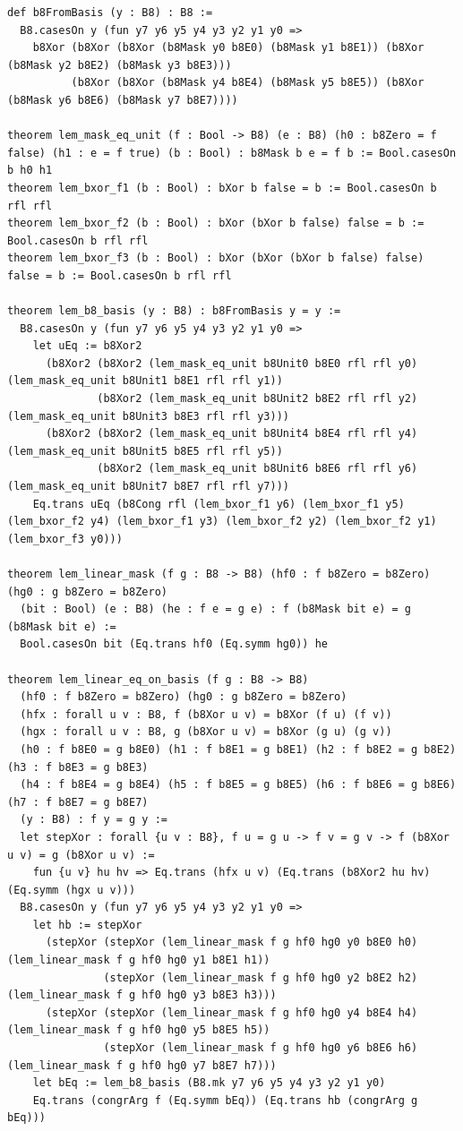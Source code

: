 \documentclass[11pt,letterpaper]{article}
\theoremstyle{spectralthm}
\begin{document}
\begin{lstlisting}[language=Lean4,caption={Standalone Pure Init.Prelude Term-Mode Lean 4 Kernel Suite (thm30--thm61, v0.0.0, 0 sorry, 0 axioms).},label={lst:lean_unified}]
def b8FromBasis (y : B8) : B8 :=
  B8.casesOn y (fun y7 y6 y5 y4 y3 y2 y1 y0 =>
    b8Xor (b8Xor (b8Xor (b8Mask y0 b8E0) (b8Mask y1 b8E1)) (b8Xor (b8Mask y2 b8E2) (b8Mask y3 b8E3)))
          (b8Xor (b8Xor (b8Mask y4 b8E4) (b8Mask y5 b8E5)) (b8Xor (b8Mask y6 b8E6) (b8Mask y7 b8E7))))

theorem lem_mask_eq_unit (f : Bool -> B8) (e : B8) (h0 : b8Zero = f false) (h1 : e = f true) (b : Bool) : b8Mask b e = f b := Bool.casesOn b h0 h1
theorem lem_bxor_f1 (b : Bool) : bXor b false = b := Bool.casesOn b rfl rfl
theorem lem_bxor_f2 (b : Bool) : bXor (bXor b false) false = b := Bool.casesOn b rfl rfl
theorem lem_bxor_f3 (b : Bool) : bXor (bXor (bXor b false) false) false = b := Bool.casesOn b rfl rfl

theorem lem_b8_basis (y : B8) : b8FromBasis y = y :=
  B8.casesOn y (fun y7 y6 y5 y4 y3 y2 y1 y0 =>
    let uEq := b8Xor2
      (b8Xor2 (b8Xor2 (lem_mask_eq_unit b8Unit0 b8E0 rfl rfl y0) (lem_mask_eq_unit b8Unit1 b8E1 rfl rfl y1))
              (b8Xor2 (lem_mask_eq_unit b8Unit2 b8E2 rfl rfl y2) (lem_mask_eq_unit b8Unit3 b8E3 rfl rfl y3)))
      (b8Xor2 (b8Xor2 (lem_mask_eq_unit b8Unit4 b8E4 rfl rfl y4) (lem_mask_eq_unit b8Unit5 b8E5 rfl rfl y5))
              (b8Xor2 (lem_mask_eq_unit b8Unit6 b8E6 rfl rfl y6) (lem_mask_eq_unit b8Unit7 b8E7 rfl rfl y7)))
    Eq.trans uEq (b8Cong rfl (lem_bxor_f1 y6) (lem_bxor_f1 y5) (lem_bxor_f2 y4) (lem_bxor_f1 y3) (lem_bxor_f2 y2) (lem_bxor_f2 y1) (lem_bxor_f3 y0)))

theorem lem_linear_mask (f g : B8 -> B8) (hf0 : f b8Zero = b8Zero) (hg0 : g b8Zero = b8Zero)
  (bit : Bool) (e : B8) (he : f e = g e) : f (b8Mask bit e) = g (b8Mask bit e) :=
  Bool.casesOn bit (Eq.trans hf0 (Eq.symm hg0)) he

theorem lem_linear_eq_on_basis (f g : B8 -> B8)
  (hf0 : f b8Zero = b8Zero) (hg0 : g b8Zero = b8Zero)
  (hfx : forall u v : B8, f (b8Xor u v) = b8Xor (f u) (f v))
  (hgx : forall u v : B8, g (b8Xor u v) = b8Xor (g u) (g v))
  (h0 : f b8E0 = g b8E0) (h1 : f b8E1 = g b8E1) (h2 : f b8E2 = g b8E2) (h3 : f b8E3 = g b8E3)
  (h4 : f b8E4 = g b8E4) (h5 : f b8E5 = g b8E5) (h6 : f b8E6 = g b8E6) (h7 : f b8E7 = g b8E7)
  (y : B8) : f y = g y :=
  let stepXor : forall {u v : B8}, f u = g u -> f v = g v -> f (b8Xor u v) = g (b8Xor u v) :=
    fun {u v} hu hv => Eq.trans (hfx u v) (Eq.trans (b8Xor2 hu hv) (Eq.symm (hgx u v)))
  B8.casesOn y (fun y7 y6 y5 y4 y3 y2 y1 y0 =>
    let hb := stepXor
      (stepXor (stepXor (lem_linear_mask f g hf0 hg0 y0 b8E0 h0) (lem_linear_mask f g hf0 hg0 y1 b8E1 h1))
               (stepXor (lem_linear_mask f g hf0 hg0 y2 b8E2 h2) (lem_linear_mask f g hf0 hg0 y3 b8E3 h3)))
      (stepXor (stepXor (lem_linear_mask f g hf0 hg0 y4 b8E4 h4) (lem_linear_mask f g hf0 hg0 y5 b8E5 h5))
               (stepXor (lem_linear_mask f g hf0 hg0 y6 b8E6 h6) (lem_linear_mask f g hf0 hg0 y7 b8E7 h7)))
    let bEq := lem_b8_basis (B8.mk y7 y6 y5 y4 y3 y2 y1 y0)
    Eq.trans (congrArg f (Eq.symm bEq)) (Eq.trans hb (congrArg g bEq)))


\end{lstlisting}
\end{document}
